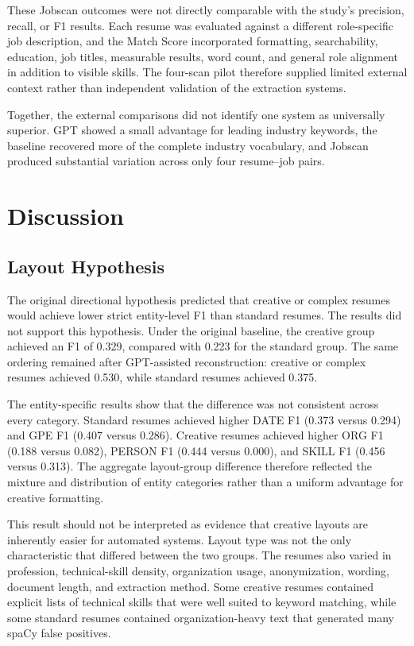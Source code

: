 \documentclass[conference]{IEEEtran}
\begin{document}
These Jobscan outcomes were not directly comparable with the study's
precision, recall, or F1 results. Each resume was evaluated against a
different role-specific job description, and the Match Score incorporated
formatting, searchability, education, job titles, measurable results,
word count, and general role alignment in addition to visible skills.
The four-scan pilot therefore supplied limited external context rather
than independent validation of the extraction systems.

Together, the external comparisons did not identify one system as
universally superior. GPT showed a small advantage for leading
industry keywords, the baseline recovered more of the complete industry
vocabulary, and Jobscan produced substantial variation across only four
resume--job pairs.

\section{Discussion}

\subsection{Layout Hypothesis}

The original directional hypothesis predicted that creative or complex
resumes would achieve lower strict entity-level F1 than standard
resumes. The results did not support this hypothesis. Under the original
baseline, the creative group achieved an F1 of 0.329, compared with
0.223 for the standard group. The same ordering remained after
GPT-assisted reconstruction: creative or complex resumes achieved 0.530,
while standard resumes achieved 0.375.

The entity-specific results show that the difference was not consistent
across every category. Standard resumes achieved higher DATE F1
(0.373 versus 0.294) and GPE F1 (0.407 versus 0.286). Creative resumes
achieved higher ORG F1 (0.188 versus 0.082), PERSON F1
(0.444 versus 0.000), and SKILL F1 (0.456 versus 0.313). The aggregate
layout-group difference therefore reflected the mixture and distribution
of entity categories rather than a uniform advantage for creative
formatting.

This result should not be interpreted as evidence that creative layouts
are inherently easier for automated systems. Layout type was not the
only characteristic that differed between the two groups. The resumes
also varied in profession, technical-skill density, organization usage,
anonymization, wording, document length, and extraction method. Some
creative resumes contained explicit lists of technical skills that were
well suited to keyword matching, while some standard resumes contained
organization-heavy text that generated many spaCy false positives.
\end{document}
